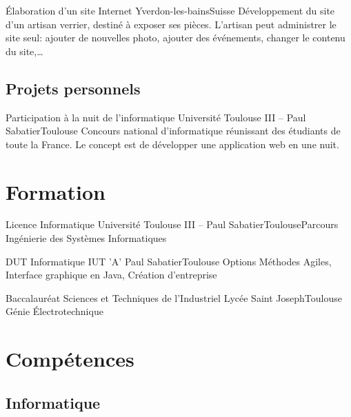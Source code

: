\documentclass{my_cv_bis}
\begin{document}
	{Élaboration d’un site Internet}
	{Yverdon-les-bains}{Suisse}
	{Développement du site d’un artisan verrier, destiné à exposer ses pièces. L'artisan peut administrer le site
	seul: ajouter de nouvelles photo, ajouter des événements, changer le contenu du site,\ldots}
	{}

	\subsection{Projets personnels}
	{Participation à la nuit de l'informatique}
	{Université Toulouse III -- Paul Sabatier}{Toulouse}
	{ Concours national d’informatique réunissant des étudiants de toute la France. Le concept est de développer une application web en une nuit.} 
	{}
	\vspace{-20px}
\section{Formation}
	{Licence Informatique}
	{Université Toulouse III -- Paul Sabatier}{Toulouse}{Parcours Ingénierie des Systèmes Informatiques}{}
	
	{DUT Informatique}
	{IUT 'A' Paul Sabatier}{Toulouse}
	{Options Méthodes Agiles, Interface graphique en Java, Création d'entreprise}
	{}
	
	{Baccalauréat Sciences et Techniques de l'Industriel}
	{Lycée Saint Joseph}{Toulouse}
	{Génie Électrotechnique}{}
	\vspace{-20px}
\section{Compétences}
		\subsection{Informatique}
		\\
		\\
		\\
		\\
		\\
\end{document}
